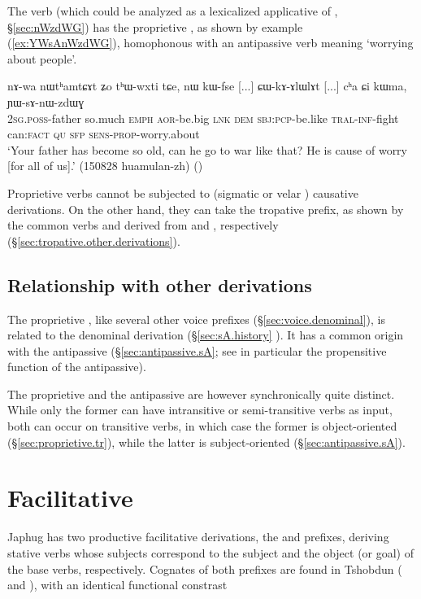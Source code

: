 The verb  (which could be analyzed as a lexicalized applicative of , §\ref{sec:nWzdWG}) has the  proprietive , as shown by example (\ref{ex:YWsAnWzdWG}), homophonous with an antipassive verb meaning `worrying about people'.

\begin{exe}
\ex \label{ex:YWsAnWzdWG}
\gll nɤ-wa nɯtʰamtɕɤt ʑo tʰɯ-wxti tɕe, nɯ kɯ-fse [...] ɕɯ-kɤ-ɤlɯlɤt  [...] cʰa ɕi kɯma, ɲɯ-sɤ-nɯ-zdɯɣ\\
\textsc{2sg}.\textsc{poss}-father so.much \textsc{emph} \textsc{aor}-be.big \textsc{lnk} \textsc{dem} \textsc{sbj}:\textsc{pcp}-be.like { } \textsc{tral}-\textsc{inf}-fight { } can:\textsc{fact} \textsc{qu} \textsc{sfp} \textsc{sens}-\textsc{prop}-worry.about\\
\glt `Your father has become so old, can he go to war like that? He is cause of worry [for all of us].' (150828 huamulan-zh) ()
\end{exe}

Proprietive verbs cannot be subjected to (sigmatic  or velar ) causative derivations. On the other hand, they can take the tropative  prefix, as shown by the common verbs  and  derived from  and , respectively (§\ref{sec:tropative.other.derivations}).

\subsection{Relationship with other derivations} 
The proprietive , like several other voice prefixes (§\ref{sec:voice.denominal}), is related to the denominal  derivation (§\ref{sec:sA.history} ). It has a common origin with the antipassive  (§\ref{sec:antipassive.sA}; see in particular the propensitive function of the antipassive). 

The proprietive and the  antipassive are however synchronically quite distinct. While only the former can have intransitive or semi-transitive verbs as input, both can occur on transitive verbs, in which case the former is object-oriented (§\ref{sec:proprietive.tr}), while the latter is subject-oriented (§\ref{sec:antipassive.sA}).


\section{Facilitative} \label{sec:facilitative}
Japhug has two productive facilitative derivations, the  and  prefixes, deriving stative verbs whose subjects correspond to the subject and the object (or goal) of the base verbs, respectively. Cognates of both prefixes are found in Tshobdun ( and ), with an identical functional constrast \citep{jackson14morpho}


